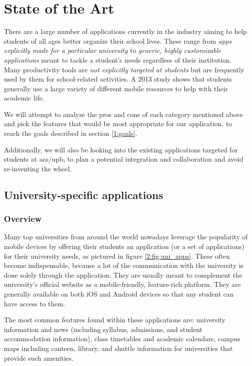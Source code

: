 \chapter{State of the Art} \label{chapter2}

There are a large number of applications currently in the industry aiming to help students of all ages better organize their school lives. These range from \textit{apps explicitly made for a particular university} to \textit{generic, highly customizable applications} meant to tackle a student's needs regardless of their institution. Many productivity tools are \textit{not explicitly targeted at students} but are frequently used by them for school-related activities. A 2013 study\cite{chen2013exploring} shows that students generally use a large variety of different mobile resources to help with their academic life.

We will attempt to analyze the pros and cons of each category mentioned above and pick the features that would be most appropriate for our application, to reach the goals described in section \ref{1:goals}.

Additionally, we will also be looking into the existing applications targeted for students at \acrshort{acs}/\acrshort{upb}, to plan a potential integration and collaboration and avoid re-inventing the wheel.

\section{University-specific applications} \label{2:uni_apps}

    \subsection{Overview} \label{2:uni_apps_overview}

        Many top universities from around the world nowadays leverage the popularity of mobile devices by offering their students an application (or a set of applications) for their university needs, as pictured in figure \ref{2:fig:uni_apps}. These often become indispensable, because a lot of the communication with the university is done solely through the application. They are usually meant to complement the university's official website as a mobile-friendly, feature-rich platform. They are generally available on both iOS and Android devices so that any student can have access to them.
        
        The most common features found within these applications are: university information and news (including syllabus, admissions, and student accommodation information), class timetables and academic calendars, campus maps including canteen, library, and shuttle information for universities that provide such amenities.
        
